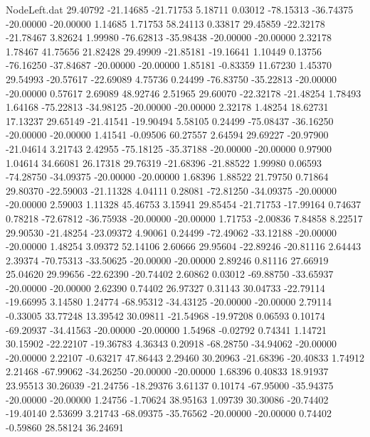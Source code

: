 \begin{filecontents}{NodeLeft.dat}
  29.40792  -21.14685  -21.71753     5.18711    0.03012  -78.15313  -36.74375  -20.00000  -20.00000    1.14685    1.71753   58.24113    0.33817
  29.45859  -22.32178  -21.78467     3.82624    1.99980  -76.62813  -35.98438  -20.00000  -20.00000    2.32178    1.78467   41.75656   21.82428
  29.49909  -21.85181  -19.16641     1.10449    0.13756  -76.16250  -37.84687  -20.00000  -20.00000    1.85181   -0.83359   11.67230    1.45370
  29.54993  -20.57617  -22.69089     4.75736    0.24499  -76.83750  -35.22813  -20.00000  -20.00000    0.57617    2.69089   48.92746    2.51965
  29.60070  -22.32178  -21.48254     1.78493    1.64168  -75.22813  -34.98125  -20.00000  -20.00000    2.32178    1.48254   18.62731   17.13237
  29.65149  -21.41541  -19.90494     5.58105    0.24499  -75.08437  -36.16250  -20.00000  -20.00000    1.41541   -0.09506   60.27557    2.64594
  29.69227  -20.97900  -21.04614     3.21743    2.42955  -75.18125  -35.37188  -20.00000  -20.00000    0.97900    1.04614   34.66081   26.17318
  29.76319  -21.68396  -21.88522     1.99980    0.06593  -74.28750  -34.09375  -20.00000  -20.00000    1.68396    1.88522   21.79750    0.71864
  29.80370  -22.59003  -21.11328     4.04111    0.28081  -72.81250  -34.09375  -20.00000  -20.00000    2.59003    1.11328   45.46753    3.15941
  29.85454  -21.71753  -17.99164     0.74637    0.78218  -72.67812  -36.75938  -20.00000  -20.00000    1.71753   -2.00836    7.84858    8.22517
  29.90530  -21.48254  -23.09372     4.90061    0.24499  -72.49062  -33.12188  -20.00000  -20.00000    1.48254    3.09372   52.14106    2.60666
  29.95604  -22.89246  -20.81116     2.64443    2.39374  -70.75313  -33.50625  -20.00000  -20.00000    2.89246    0.81116   27.66919   25.04620
  29.99656  -22.62390  -20.74402     2.60862    0.03012  -69.88750  -33.65937  -20.00000  -20.00000    2.62390    0.74402   26.97327    0.31143
  30.04733  -22.79114  -19.66995     3.14580    1.24774  -68.95312  -34.43125  -20.00000  -20.00000    2.79114   -0.33005   33.77248   13.39542
  30.09811  -21.54968  -19.97208     0.06593    0.10174  -69.20937  -34.41563  -20.00000  -20.00000    1.54968   -0.02792    0.74341    1.14721
  30.15902  -22.22107  -19.36783     4.36343    0.20918  -68.28750  -34.94062  -20.00000  -20.00000    2.22107   -0.63217   47.86443    2.29460
  30.20963  -21.68396  -20.40833     1.74912    2.21468  -67.99062  -34.26250  -20.00000  -20.00000    1.68396    0.40833   18.91937   23.95513
  30.26039  -21.24756  -18.29376     3.61137    0.10174  -67.95000  -35.94375  -20.00000  -20.00000    1.24756   -1.70624   38.95163    1.09739
  30.30086  -20.74402  -19.40140     2.53699    3.21743  -68.09375  -35.76562  -20.00000  -20.00000    0.74402   -0.59860   28.58124   36.24691

\end{filecontents}
